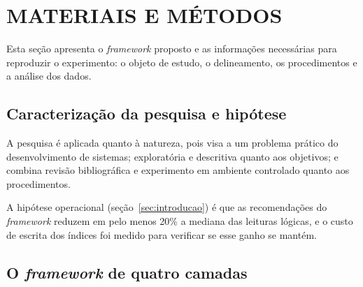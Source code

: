 %

\section{MATERIAIS E MÉTODOS}\label{sec:mm}

Esta seção apresenta o \textit{framework} proposto e as informações necessárias para reproduzir o experimento: o objeto de estudo, o delineamento, os procedimentos e a análise dos dados.

\subsection{Caracterização da pesquisa e hipótese}\label{sec:caracterizacao}

A pesquisa é aplicada quanto à natureza, pois visa a um problema prático do desenvolvimento de sistemas; exploratória e descritiva quanto aos objetivos; e combina revisão bibliográfica e experimento em ambiente controlado quanto aos procedimentos. 

A hipótese operacional (seção~\ref{sec:introducao}) é que as recomendações do \textit{framework} reduzem em pelo menos 20\% a mediana das leituras lógicas, e o custo de escrita dos índices foi medido para verificar se esse ganho se mantém.

\subsection{O \textit{framework} de quatro camadas}\label{sec:framework}

